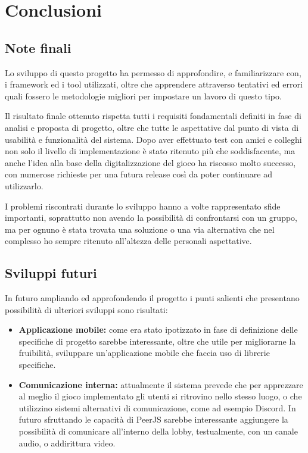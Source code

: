 \chapter{Conclusioni}

\section{Note finali}
Lo sviluppo di questo progetto ha permesso di approfondire, e familiarizzare con, i framework ed i tool utilizzati, oltre che apprendere attraverso tentativi ed errori quali fossero le metodologie migliori per impostare un lavoro di questo tipo.

Il risultato finale ottenuto rispetta tutti i requisiti fondamentali definiti in fase di analisi e proposta di progetto, oltre che tutte le aspettative dal punto di vista di usabilità e funzionalità del sistema. Dopo aver effettuato test con amici e colleghi non solo il livello di implementazione è stato ritenuto più che soddisfacente, ma anche l'idea alla base della digitalizzazione del gioco ha riscosso molto successo, con numerose richieste per una futura release così da poter continuare ad utilizzarlo.

I problemi riscontrati durante lo sviluppo hanno a volte rappresentato sfide importanti, soprattutto non avendo la possibilità di confrontarsi con un gruppo, ma per ognuno è stata trovata una soluzione o una via alternativa che nel complesso ho sempre ritenuto all'altezza delle personali aspettative.

\section{Sviluppi futuri}
In futuro ampliando ed approfondendo il progetto i punti salienti che presentano possibilità di ulteriori sviluppi sono risultati:

\begin{itemize}
    \item \textbf{Applicazione mobile:} come era stato ipotizzato in fase di definizione delle specifiche di progetto sarebbe interessante, oltre che utile per migliorarne la fruibilità, sviluppare un'applicazione mobile che faccia uso di librerie specifiche.
    \item \textbf{Comunicazione interna:} attualmente il sistema prevede che per apprezzare al meglio il gioco implementato gli utenti si ritrovino nello stesso luogo, o che utilizzino sistemi alternativi di comunicazione, come ad esempio Discord. In futuro sfruttando le capacità di PeerJS sarebbe interessante aggiungere la possibilità di comunicare all'interno della lobby, testualmente, con un canale audio, o addirittura video.
\end{itemize}